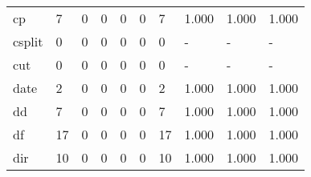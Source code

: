 \begin{longtable}{lp{2.0cm}p{2.0cm}p{2.0cm}p{2.0cm}p{2.0cm}p{2.0cm}p{2.0cm}p{2.0cm}p{2.0cm}}
cp        &                      7 &                                  0 &                                 0 &                                0 &                                 0 &                               7 &                                1.000 &                                  1.000 &                                1.000 \\
csplit    &                      0 &                                  0 &                                 0 &                                0 &                                 0 &                               0 &                                    - &                                      - &                                    - \\
cut       &                      0 &                                  0 &                                 0 &                                0 &                                 0 &                               0 &                                    - &                                      - &                                    - \\
date      &                      2 &                                  0 &                                 0 &                                0 &                                 0 &                               2 &                                1.000 &                                  1.000 &                                1.000 \\
dd        &                      7 &                                  0 &                                 0 &                                0 &                                 0 &                               7 &                                1.000 &                                  1.000 &                                1.000 \\
df        &                     17 &                                  0 &                                 0 &                                0 &                                 0 &                              17 &                                1.000 &                                  1.000 &                                1.000 \\
dir       &                     10 &                                  0 &                                 0 &                                0 &                                 0 &                              10 &                                1.000 &                                  1.000 &                                1.000 \\

\end{longtable}

